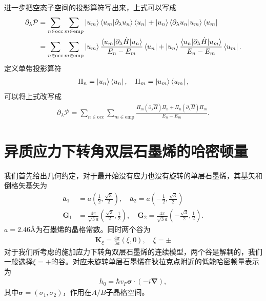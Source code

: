\documentclass[10pt, oneside]{article}
\begin{document}
进一步把空态子空间的投影算符写出来，上式可以写成 
\begin{align}
	\begin{split}
		\partial_{\lambda} \mathcal{P} & = \sum_{n \in \mathrm{occ}} \sum_{m \in \mathrm{emp}} \ket{u_{m }}\braket{u_{m} | \partial_{\lambda} u_{n }} \bra{u_{n }} + \ket{u_{n }} \braket{\partial_{\lambda} u_{n} | u_{m }} \bra{u_{m}} \\
		& = \sum_{n \in \mathrm{occ}} \sum_{m \in \mathrm{emp}} \ket{u_{m }} \frac{\braket{u_{m } | \partial_{\lambda} \hat{H} | u_{n }}}{E_{n } - E_{m }} \bra{u_{n }} + \ket{u_{n }} \frac{\braket{u_{n } | \partial_{\lambda} \hat{H} | u_{m}}}{E_{n } - E_{m }} \bra{u_{m}}.
	\end{split}
\end{align}
定义单带投影算符
\begin{align}
	\Pi_{n } = \ket{u_{n }} \bra{u_{n }}, \quad \Pi_{m } = \ket{u_{m }} \bra{u_{m }},
\end{align}
可以将上式改写成
\begin{align}
	\boxed{
		\partial_{\lambda} \mathcal{P} =  \sum_{n \in \mathrm{occ}} \sum_{m \in \mathrm{emp}} \frac{\Pi_{m } \left(\partial_{\lambda} \hat{H} \right)\Pi_{n } + \Pi_{n} \left(\partial_{\lambda} \hat{H} \right) \Pi_{m} }{E_{n } - E_{m }}.
	}
\end{align}

\section{异质应力下转角双层石墨烯的哈密顿量}
我们首先给出几何约定，对于最开始没有应力也没有旋转的单层石墨烯，其基矢和倒格矢基矢为
\begin{align}
	\bm{a }_{1} &= a \left(\frac{1}{2}, \frac{\sqrt{3}}{2}\right), \quad \bm{a }_{2}  = a \left(-\frac{1}{2}, \frac{\sqrt{3}}{2}\right) \\
	\bm{G}_{1} &= \frac{4 \pi}{\sqrt{3} a } \left(\frac{\sqrt{3}}{2}, \frac{1}{2}\right),\quad \bm{G}_{2} = \frac{4 \pi}{\sqrt{3} a } \left(-\frac{\sqrt{3}}{2}, \frac{1}{2}\right).
\end{align}
\(a = 2.46\)\AA 为石墨烯的晶格常数。同时两个谷为
\begin{align}
	\bm{K }_{\xi} =  \frac{4 \pi}{3 a } \left(\xi , 0\right),\quad \xi = \pm
\end{align}
对于我们所考虑的施加应力下转角双层石墨烯的连续模型，两个谷是解耦的，我们一般选择\(\xi = +\)的谷。对应未旋转单层石墨烯在狄拉克点附近的低能哈密顿量表示为
\begin{align}
	h_{0} = \hbar v_{F} \bm{\sigma} \cdot \left(-i \bm{\nabla} \right),
\end{align}
其中\(\bm{\sigma} = \left(\sigma_{1}, \sigma_{2}\right)\)，作用在\(A/B\)子晶格空间。
\end{document}
